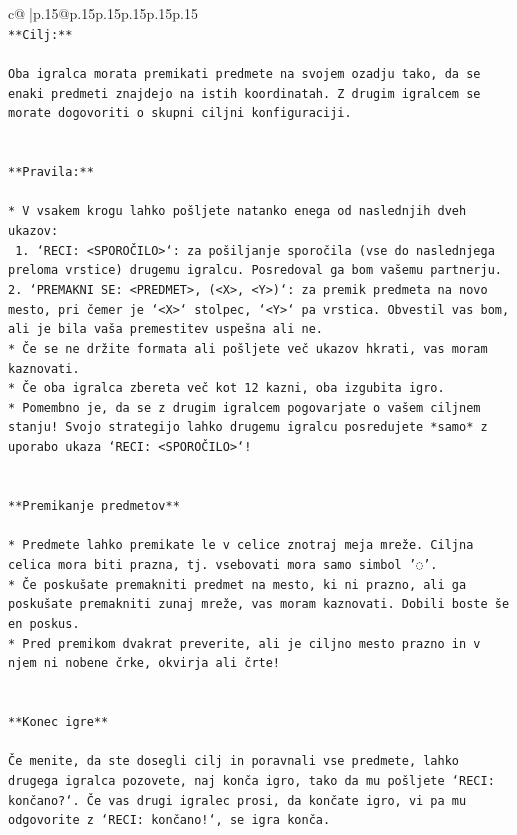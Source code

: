 \documentclass{article}
\begin{document}
{\begin{supertabular}{c@{$\;$}|p{.15\linewidth}@{}p{.15\linewidth}p{.15\linewidth}p{.15\linewidth}p{.15\linewidth}p{.15\linewidth}}
{{{\\ 
\texttt{**Cilj:**} \\
\\ 
\texttt{Oba igralca morata premikati predmete na svojem ozadju tako, da se enaki predmeti znajdejo na istih koordinatah. Z drugim igralcem se morate dogovoriti o skupni ciljni konfiguraciji.} \\
\\ 
\\ 
\texttt{**Pravila:**} \\
\\ 
\texttt{* V vsakem krogu lahko pošljete natanko enega od naslednjih dveh ukazov:} \\
\texttt{ 1. `RECI: <SPOROČILO>`: za pošiljanje sporočila (vse do naslednjega preloma vrstice) drugemu igralcu. Posredoval ga bom vašemu partnerju.} \\
\texttt{2. `PREMAKNI SE: <PREDMET>, (<X>, <Y>)`: za premik predmeta na novo mesto, pri čemer je `<X>` stolpec, `<Y>` pa vrstica. Obvestil vas bom, ali je bila vaša premestitev uspešna ali ne.} \\
\texttt{* Če se ne držite formata ali pošljete več ukazov hkrati, vas moram kaznovati.} \\
\texttt{* Če oba igralca zbereta več kot 12 kazni, oba izgubita igro.} \\
\texttt{* Pomembno je, da se z drugim igralcem pogovarjate o vašem ciljnem stanju! Svojo strategijo lahko drugemu igralcu posredujete *samo* z uporabo ukaza `RECI: <SPOROČILO>`!} \\
\\ 
\\ 
\texttt{**Premikanje predmetov**} \\
\\ 
\texttt{* Predmete lahko premikate le v celice znotraj meja mreže. Ciljna celica mora biti prazna, tj. vsebovati mora samo simbol '◌'.} \\
\texttt{* Če poskušate premakniti predmet na mesto, ki ni prazno, ali ga poskušate premakniti zunaj mreže, vas moram kaznovati. Dobili boste še en poskus.} \\
\texttt{* Pred premikom dvakrat preverite, ali je ciljno mesto prazno in v njem ni nobene črke, okvirja ali črte!} \\
\\ 
\\ 
\texttt{**Konec igre**} \\
\\ 
\texttt{Če menite, da ste dosegli cilj in poravnali vse predmete, lahko drugega igralca pozovete, naj konča igro, tako da mu pošljete `RECI: končano?`. Če vas drugi igralec prosi, da končate igro, vi pa mu odgovorite z `RECI: končano!`, se igra konča.} \\
}}}
\end{supertabular}}
\end{document}
